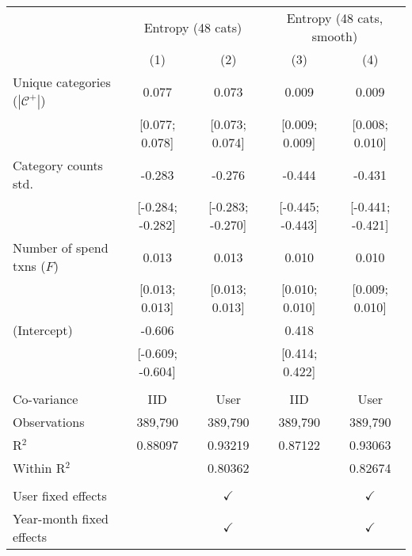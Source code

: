 
\begingroup
\centering
\begin{tabular}{lcccc}
   \toprule
    & \multicolumn{2}{c}{Entropy (48 cats)} & \multicolumn{2}{c}{Entropy (48 cats, smooth)} \\ 
                                          & (1)              & (2)              & (3)              & (4)\\  
   \midrule 
   Unique categories ($|\mathcal{C}^+|$)  & 0.077            & 0.073            & 0.009            & 0.009\\   
                                          & [0.077; 0.078]   & [0.073; 0.074]   & [0.009; 0.009]   & [0.008; 0.010]\\   
   Category counts std.                   & -0.283           & -0.276           & -0.444           & -0.431\\   
                                          & [-0.284; -0.282] & [-0.283; -0.270] & [-0.445; -0.443] & [-0.441; -0.421]\\   
   Number of spend txns ($F$)             & 0.013            & 0.013            & 0.010            & 0.010\\   
                                          & [0.013; 0.013]   & [0.013; 0.013]   & [0.010; 0.010]   & [0.009; 0.010]\\   
   (Intercept)                            & -0.606           &                  & 0.418            &   \\   
                                          & [-0.609; -0.604] &                  & [0.414; 0.422]   &   \\   
    \\
   Co-variance                            & IID              & User             & IID              & User \\   
   Observations                           & 389,790          & 389,790          & 389,790          & 389,790\\  
   R$^2$                                  & 0.88097          & 0.93219          & 0.87122          & 0.93063\\  
   Within R$^2$                           &                  & 0.80362          &                  & 0.82674\\  
    \\
   User fixed effects                     &                  & $\checkmark$     &                  & $\checkmark$\\   
   Year-month fixed effects               &                  & $\checkmark$     &                  & $\checkmark$\\   
   \bottomrule
\end{tabular}
\par\endgroup


